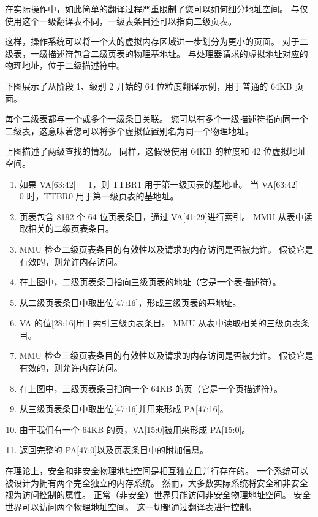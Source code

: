 在实际操作中，如此简单的翻译过程严重限制了您可以如何细分地址空间。
与仅使用这个一级翻译表不同，一级表条目还可以指向二级页表。

这样，操作系统可以将一个大的虚拟内存区域进一步划分为更小的页面。
对于二级表，一级描述符包含二级页表的物理基地址。
与处理器请求的虚拟地址对应的物理地址，位于二级描述符中。

下图展示了从阶段 1、级别 2 开始的 64 位粒度翻译示例，用于普通的 64KB 页面。


每个二级表都与一个或多个一级条目关联。
您可以有多个一级描述符指向同一个二级表，这意味着您可以将多个虚拟位置别名为同一个物理地址。

上图描述了两级查找的情况。
同样，这假设使用 64KB 的粒度和 42 位虚拟地址空间。

\begin{enumerate}
\item
  如果 VA{[}63:42{]} = 1，则 TTBR1 用于第一级页表的基地址。
  当 VA{[}63:42{]}
  = 0 时，TTBR0 用于第一级页表的基地址。
\item
  页表包含 8192 个 64 位页表条目，通过 VA{[}41:29{]}进行索引。
  MMU 从表中读取相关的二级页表条目。
\item
  MMU 检查二级页表条目的有效性以及请求的内存访问是否被允许。
  假设它是有效的，则允许内存访问。
\item
  在上图中，二级页表条目指向三级页表的地址（它是一个表描述符）。
\item
  从二级页表条目中取出位{[}47:16{]}，形成三级页表的基地址。
\item
  VA 的位{[}28:16{]}用于索引三级页表条目。
  MMU 从表中读取相关的三级页表条目。
\item
  MMU 检查三级页表条目的有效性以及请求的内存访问是否被允许。
  假设它是有效的，则允许内存访问。
\item
  在上图中，三级页表条目指向一个 64KB 的页（它是一个页描述符）。
\item
  从三级页表条目中取出位{[}47:16{]}并用来形成 PA{[}47:16{]}。
\item
  由于我们有一个 64KB 的页，VA{[}15:0{]}被用来形成 PA{[}15:0{]}。
\item
  返回完整的 PA{[}47:0{]}以及页表条目中的附加信息。
\end{enumerate}


在理论上，安全和非安全物理地址空间是相互独立且并行存在的。
一个系统可以被设计为拥有两个完全独立的内存系统。
然而，大多数实际系统将安全和非安全视为访问控制的属性。
正常（非安全）世界只能访问非安全物理地址空间。
安全世界可以访问两个物理地址空间。
这一切都通过翻译表进行控制。


